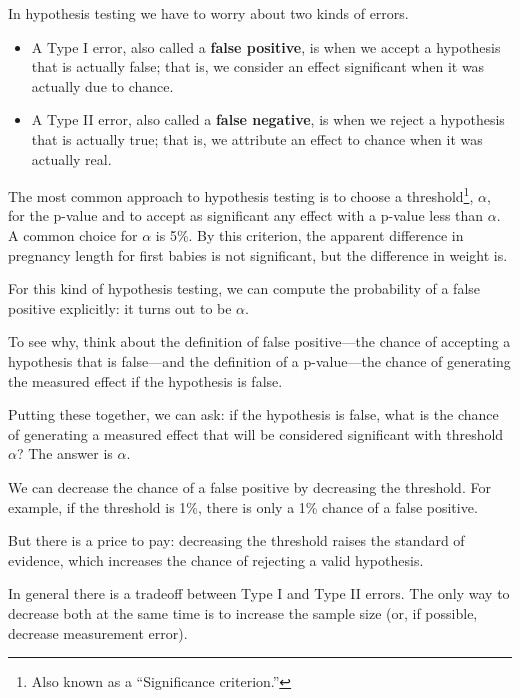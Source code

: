 \documentclass[12pt]{book}
\begin{document}
In hypothesis testing we have to worry about two kinds of errors.

\begin{itemize}

\item A Type I error, also called a {\bf false positive}, is when we
  accept a hypothesis that is actually false; that is, we consider an
  effect significant when it was actually due to chance.

\item A Type II error, also called a {\bf false negative}, is when we
  reject a hypothesis that is actually true; that is, we attribute an
  effect to chance when it was actually real.

\end{itemize}

The most common approach to hypothesis testing is to choose a
threshold\footnote{Also known as a ``Significance criterion.''},
$\alpha$, for the p-value and to accept as significant any effect with
a p-value less than $\alpha$.  A common choice for $\alpha$ is 5\%.
By this criterion, the apparent difference in pregnancy length for
first babies is not significant, but the difference in weight is.

For this kind of hypothesis testing, we can compute the probability of
a false positive explicitly: it turns out to be $\alpha$.

To see why, think about the definition of false positive---the chance
of accepting a hypothesis that is false---and the definition of a
p-value---the chance of generating the measured effect if the
hypothesis is false.

Putting these together, we can ask: if the hypothesis is false,
what is the chance of generating a measured effect that will be
considered significant with threshold $\alpha$?  The answer is
$\alpha$.

We can decrease the chance of a false positive by decreasing the
threshold.  For example, if the threshold is 1\%, there is only a 1\%
chance of a false positive.

But there is a price to pay: decreasing the threshold raises the
standard of evidence, which increases the chance of rejecting
a valid hypothesis.

In general there is a tradeoff between Type I and Type II errors.
The only way to decrease both at the same time is to increase the
sample size (or, if possible, decrease measurement error).
\end{document}

